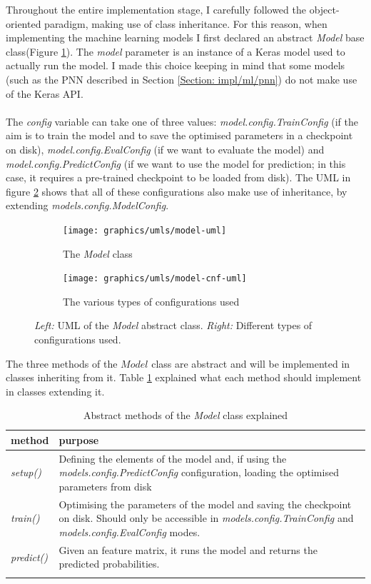 	Throughout the entire implementation stage, I carefully followed the object-oriented paradigm, making use of class inheritance. For this reason, when implementing the machine learning models I first declared an abstract \textit{Model} base class(Figure \ref{Fig: impl/ml/model/uml/model}). The \textit{model} parameter is an instance of a Keras model used to actually run the model. I made this choice keeping in mind that some models (such as the PNN described in Section \ref{Section: impl/ml/pnn}) do not make use of the Keras API. \\ \\
	The \textit{config} variable can take one of three values: \textit{model.config.TrainConfig} (if the aim is to train the model and to save the optimised parameters in a checkpoint on disk), \textit{model.config.EvalConfig} (if we want to evaluate the model) and \textit{model.config.PredictConfig} (if we want to use the model for prediction; in this case, it requires a pre-trained checkpoint to be loaded from disk). The UML in figure \ref{Fig: impl/ml/model/uml/configs} shows that all of these configurations also make use of inheritance, by extending \textit{models.config.ModelConfig}.
	\begin{figure}[H]
		\centering
		\begin{subfigure}[b]{.3\textwidth}
			\texttt{[image: graphics/umls/model-uml]}
			\caption{The \textit{Model} class}
			\label{Fig: impl/ml/model/uml/model}
			\hspace{1pt}
		\end{subfigure}\hfill
		\begin{subfigure}[b]{.55\textwidth}
			\texttt{[image: graphics/umls/model-cnf-uml]}
			\caption{The various types of configurations used}
			\label{Fig: impl/ml/model/uml/configs}
		\end{subfigure}
		\caption{\textit{Left:} UML of the \textit{Model} abstract class. \textit{Right:} Different types of configurations used.}
		\label{Fig: impl/ml/model/uml}
	\end{figure}
	The three methods of the $Model$ class are abstract and will be implemented in classes inheriting from it. Table \ref{Table: impl/ml/model/purpose} explained what each method should implement in classes extending it.
	\begin{longtable}{p{}p{}}
		\textbf{method} & \textbf{purpose} \\
		\hline
		\textit{setup()} & Defining the elements of the model and, if using the \textit{models.config.PredictConfig} configuration, loading the optimised parameters from disk \\
		\hline
		\textit{train()} & Optimising the parameters of the model and saving the checkpoint on disk. Should only be accessible in \textit{models.config.TrainConfig} and \textit{models.config.EvalConfig} modes. \\
		\hline
		\textit{predict()} & Given an feature matrix, it runs the model and returns the predicted probabilities. \\
		\hline
		\caption{Abstract methods of the \textit{Model} class explained}
		\label{Table: impl/ml/model/purpose}
	\end{longtable}
